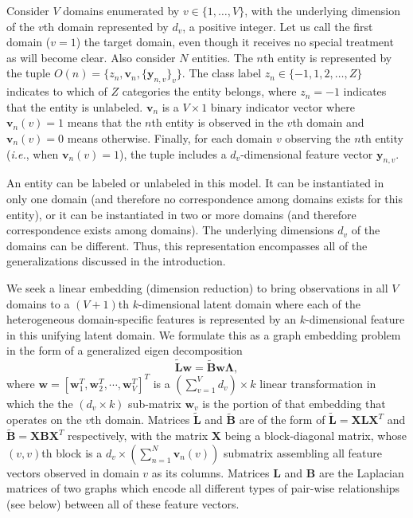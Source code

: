 \documentclass[10pt,twocolumn,letterpaper]{article}
\begin{document}
Consider $V$ domains enumerated by $v\in\{1,\ldots,V\}$, with the underlying dimension of the $v$th domain represented by $d_v$, a positive integer. Let us call the first domain ($v=1$) the target domain, even though it receives no special treatment as will become clear. Also consider $N$ entities. The $n$th entity is represented by the tuple $O(n)=\{z_{n}, \mathbf{v}_{n}, \{ \mathbf{y}_{n,v} \}_{v} \}$. The class label $z_n\in\{-1,1,2,\ldots,Z\}$ indicates to which of $Z$ categories the entity belongs, where $z_n=-1$ indicates that the entity is unlabeled. $\mathbf{v}_n$ is a $V\times 1$ binary indicator vector where $\mathbf{v}_n(v)=1$ means that the $n$th entity is observed in the $v$th domain and $\mathbf{v}_n(v)=0$ means otherwise. Finally, for each domain $v$ observing the $n$th entity (\textit{i.e.}, when $\mathbf{v}_n(v)=1$), the tuple includes a $d_v$-dimensional feature vector $\mathbf{y}_{n,v}$.

An entity can be labeled or unlabeled in this model. It can be instantiated in only one domain (and therefore no correspondence among domains exists for this entity), or it can be instantiated in two or more domains (and therefore correspondence exists among domains). The underlying dimensions $d_v$ of the domains can be different. Thus, this representation encompasses all of the generalizations discussed in the introduction.

We seek a linear embedding (dimension reduction) to bring observations in all $V$ domains to a $(V+1)$th $k$-dimensional latent domain where each of the heterogeneous domain-specific features is represented by an $k$-dimensional feature in this unifying latent domain. We formulate this as a graph embedding problem \cite{graphembedding} in the form of a generalized eigen decomposition
\begin{equation}
\label{GED}
\tilde{\mathbf{L}}\mathbf{w}=\tilde{\mathbf{B}}\mathbf{w}\mathbf{\Lambda},
\end{equation}
where $\mathbf{w}=[\mathbf{w}_{1}^{T}, \mathbf{w}_{2}^{T}, \cdots, \mathbf{w}_{V}^{T}]^{T}$ is a $(\sum_{v=1}^{V}d_{v})\times k$ linear transformation in which the the $(d_v\times k)$ sub-matrix $\mathbf{w}_{v}$ is the portion of that embedding that operates on the $v$th domain. Matrices $\tilde{\mathbf{L}}$ and $\tilde{\mathbf{B}}$ are of the form of $\tilde{\mathbf{L}}=\mathbf{X}\mathbf{L}\mathbf{X}^{T}$ and $\tilde{\mathbf{B}}=\mathbf{X}\mathbf{B}\mathbf{X}^{T}$ respectively, with the matrix $\mathbf{X}$ being a block-diagonal matrix, whose $(v,v)$th block is a $d_{v}\times(\sum_{n=1}^{N}\mathbf{v}_{n}(v))$ submatrix  assembling all feature vectors observed in domain $v$ as its columns. Matrices $\mathbf{L}$ and $\mathbf{B}$ are the Laplacian matrices of two graphs which encode all different types of pair-wise relationships (see below) between all of these feature vectors. 
\end{document}
